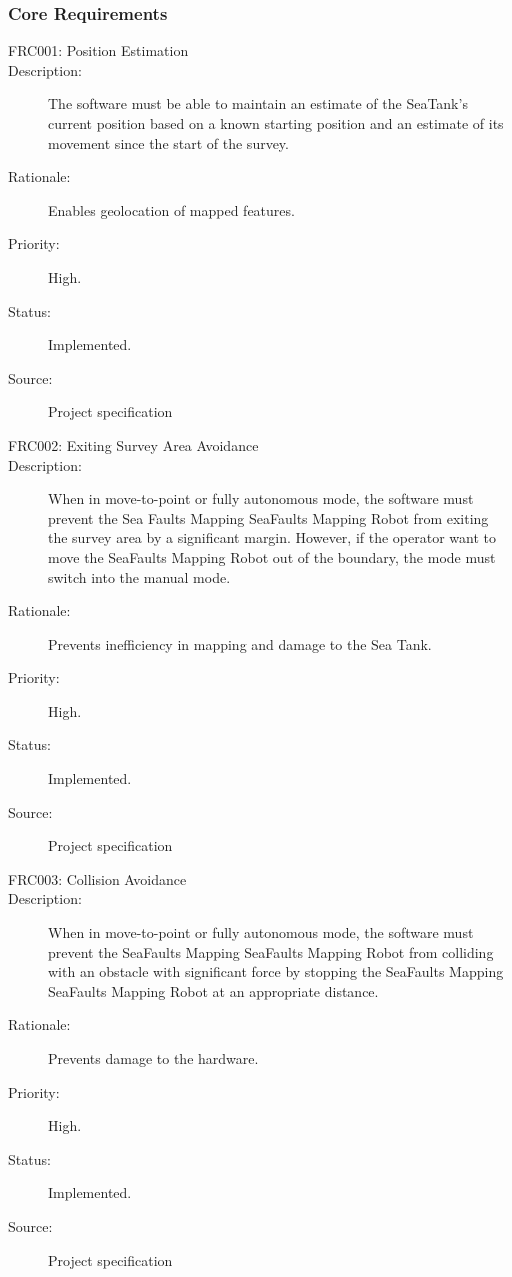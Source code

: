 \documentclass[12pt]{article}
\begin{document}
\subsubsection{Core Requirements}
\begin{description}
\item [{FRC001: Position Estimation}\label{FRC001}] 
\item [{Description: }\label{Description}] The software must be able to maintain an estimate of the SeaTank's current position based on a known starting position and an estimate of its movement since the start of the survey. 
\item[{Rationale: }\label{Rationale}] Enables geolocation of mapped features.
\item[{Priority: }\label{Priority}] High.
\item[{Status: }\label{Status}] Implemented.
\item[{Source: }\label{Source}] Project specification \cite{spec}

\item [{FRC002: Exiting Survey Area Avoidance}\label{FRC002}] 
\item [{Description: }\label{Description}] When in move-to-point or fully autonomous mode, the software must prevent the Sea Faults Mapping SeaFaults Mapping Robot from exiting the survey area by a significant margin.  However, if the operator want to move the SeaFaults Mapping Robot out of the boundary, the mode must switch into the manual mode. 
\item[{Rationale: }\label{Rationale}] Prevents inefficiency in mapping and damage to the Sea Tank.
\item[{Priority: }\label{Priority}] High.
\item[{Status: }\label{Status}] Implemented.
\item[{Source: }\label{Source}] Project specification \cite{spec}

\item [{FRC003: Collision Avoidance}\label{FRC003}] 
\item [{Description: }\label{Description}] When in move-to-point or fully autonomous mode, the software must prevent the SeaFaults Mapping SeaFaults Mapping Robot from colliding with an obstacle with significant force by stopping the SeaFaults Mapping SeaFaults Mapping Robot at an appropriate distance. 
\item[{Rationale: }\label{Rationale}] Prevents damage to the hardware.
\item[{Priority: }\label{Priority}] High.
\item[{Status: }\label{Status}] Implemented.
\item[{Source: }\label{Source}] Project specification \cite{spec}


\end{description}
\end{document}
